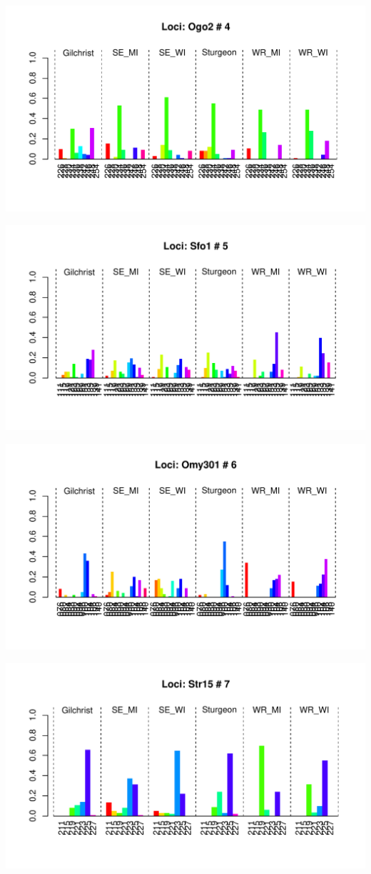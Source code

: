 \documentclass[a4paper]{scrartcl}\usepackage[]{graphicx}\usepackage[]{color}
\makeatletter
\def\maxwidth{ %
  \ifdim\Gin@nat@width>\linewidth
    \linewidth
  \else
    \Gin@nat@width
  \fi
}
\newenvironment{knitrout}{}{} %
\makeatother
\begin{document}
\begin{knitrout}
\includegraphics[width=\maxwidth]{PopGenReport_Hatchery-allelfreq-4} 

\includegraphics[width=\maxwidth]{PopGenReport_Hatchery-allelfreq-5} 

\includegraphics[width=\maxwidth]{PopGenReport_Hatchery-allelfreq-6} 

\includegraphics[width=\maxwidth]{PopGenReport_Hatchery-allelfreq-7} 


\end{knitrout}
\end{document}
